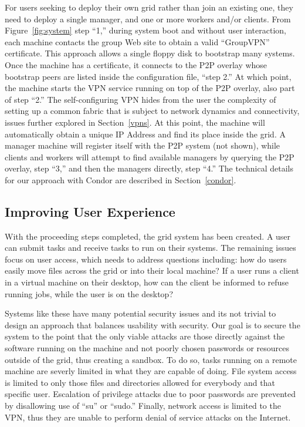 \documentclass[conference]{IEEEtran}
\begin{document}
For users seeking to deploy their own grid rather than join an existing one,
they need to deploy a single manager, and one or more workers and/or clients.
From Figure~\ref{fig:system} step ``1,'' during system boot and without user
interaction, each machine contacts the group Web site to obtain a valid
``GroupVPN'' certificate.  This approach allows a single floppy disk to
bootstrap many systems.  Once the machine has a certificate, it connects to the
P2P overlay whose bootstrap peers are listed inside the configuration file,
``step 2.''  At which point, the machine starts the VPN service running on top
of the P2P overlay, also part of step ``2.'' The self-configuring VPN hides
from the user the complexity of setting up a common fabric that is subject to
network dynamics and connectivity, issues further explored in
Section~\ref{vpns}.  At this point, the machine will automatically obtain a
unique IP Address and find its place inside the grid.  A manager machine will
register itself with the P2P system (not shown), while clients and workers will
attempt to find available managers by querying the P2P overlay, step ``3,'' and
then the managers directly, step ``4.''  The technical details for our approach
with Condor are described in Section~\ref{condor}.

\subsection{Improving User Experience}

With the proceeding steps completed, the grid system has been created.  A user
can submit tasks and receive tasks to run on their systems.  The remaining
issues focus on user access, which needs to address questions including: how do
users easily move files across the grid or into their local machine?  If a user
runs a client in a virtual machine on their desktop, how can the client be
informed to refuse running jobs, while the user is on the desktop?

Systems like these have many potential security issues and its not trivial to
design an approach that balances usability with security.  Our goal is to
secure the system to the point that the only viable attacks are those directly
against the software running on the machine and not poorly chosen passwords or
resources outside of the grid, thus creating a sandbox.  To do so, tasks
running on a remote machine are severly limited in what they are capable of
doing.  File system access is limited to only those files and directories
allowed for everybody and that specific user.  Escalation of privilege attacks
due to poor passwords are prevented by disallowing use of ``su'' or ``sudo.''
Finally, network access is limited to the VPN, thus they are unable to perform
denial of service attacks on the Internet.
\end{document}
